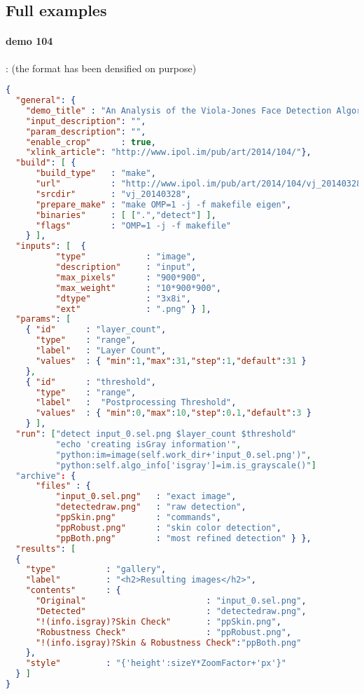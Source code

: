 \subsection{Full examples}

\paragraph{demo 104}: (the format has been densified on purpose)\\
\begin{lstlisting}[language=json,firstnumber=1]
{ 
  "general": { 
    "demo_title" : "An Analysis of the Viola-Jones Face Detection Algorithm",
    "input_description": "",
    "param_description": "",
    "enable_crop"      : true,
    "xlink_article": "http://www.ipol.im/pub/art/2014/104/"}, 
  "build": [ {
      "build_type"   : "make",
      "url"          : "http://www.ipol.im/pub/art/2014/104/vj_20140328.tar.gz", 
      "srcdir"       : "vj_20140328",
      "prepare_make" : "make OMP=1 -j -f makefile eigen",
      "binaries"     : [ [".","detect"] ],
      "flags"        : "OMP=1 -j -f makefile"
    } ],
  "inputs": [  {
          "type"            : "image", 
          "description"     : "input",
          "max_pixels"      : "900*900",
          "max_weight"      : "10*900*900",
          "dtype"           : "3x8i",
          "ext"             : ".png" } ],
  "params": [ 
    { "id"      : "layer_count",
      "type"    : "range", 
      "label"   : "Layer Count",
      "values"  : { "min":1,"max":31,"step":1,"default":31 }
    },
    { "id"      : "threshold",
      "type"    : "range",
      "label"   :  "Postprocessing Threshold",
      "values"  : { "min":0,"max":10,"step":0.1,"default":3 }
    } ],
  "run": ["detect input_0.sel.png $layer_count $threshold"
          "echo 'creating isGray information'",
          "python:im=image(self.work_dir+'input_0.sel.png')",
          "python:self.algo_info['isgray']=im.is_grayscale()"]
  "archive": {
      "files" : { 
          "input_0.sel.png"   : "exact image",
          "detectedraw.png"   : "raw detection",
          "ppSkin.png"        : "commands",
          "ppRobust.png"      : "skin color detection",
          "ppBoth.png"        : "most refined detection" } },
  "results": [
  {
    "type"          : "gallery",
    "label"         : "<h2>Resulting images</h2>",
    "contents"      : { 
      "Original"                        : "input_0.sel.png", 
      "Detected"                        : "detectedraw.png",
      "!(info.isgray)?Skin Check"       : "ppSkin.png",
      "Robustness Check"                : "ppRobust.png",
      "!(info.isgray)?Skin & Robustness Check":"ppBoth.png"
    },
    "style"         : "{'height':sizeY*ZoomFactor+'px'}"
  } ]
}
\end{lstlisting}

